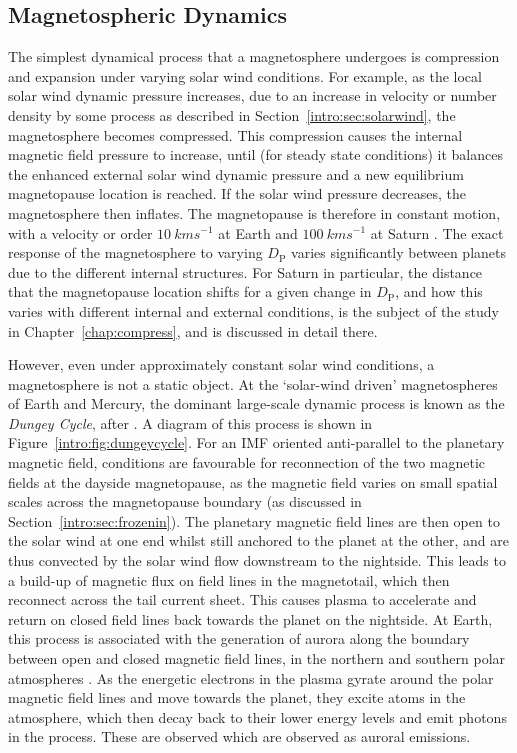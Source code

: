 \subsection{Magnetospheric Dynamics}\label{intro:sec:dynamics}
The simplest dynamical process that a magnetosphere undergoes is compression and expansion under varying solar wind conditions. For example, as the local solar wind dynamic pressure increases, due to an increase in velocity or number density by some process as described in Section~\ref{intro:sec:solarwind}, the magnetosphere becomes compressed. This compression causes the internal magnetic field pressure to increase, until (for steady state conditions) it balances the enhanced external solar wind dynamic pressure and a new equilibrium magnetopause location is reached. If the solar wind pressure decreases, the magnetosphere then inflates. The magnetopause is therefore in constant motion, with a velocity or order $\SI{10}{kms^{-1}}$ at Earth \citep{berchem1982} and $\SI{100}{kms^{-1}}$ at Saturn \citep{masters2011}. The exact response of the magnetosphere to varying $D_\mathrm{P}$ varies significantly between planets due to the different internal structures. For Saturn in particular, the distance that the magnetopause location shifts for a given change in $D_\mathrm{P}$, and how this varies with different internal and external conditions, is the subject of the study in Chapter~\ref{chap:compress}, and is discussed in detail there.

However, even under approximately constant solar wind conditions, a magnetosphere is not a static object. At the `solar-wind driven' magnetospheres of Earth and Mercury, the dominant large-scale dynamic process is known as the \textit{Dungey Cycle}, after \citet{dungey1961}. A diagram of this process is shown in Figure~\ref{intro:fig:dungeycycle}. For an IMF oriented anti-parallel to the planetary magnetic field, conditions are favourable for reconnection of the two magnetic fields at the dayside magnetopause, as the magnetic field varies on small spatial scales across the magnetopause boundary (as discussed in Section~\ref{intro:sec:frozenin}). The planetary magnetic field lines are then open to the solar wind at one end whilst still anchored to the planet at the other, and are thus convected by the solar wind flow downstream to the nightside. This leads to a build-up of magnetic flux on field lines in the magnetotail, which then reconnect across the tail current sheet. This causes plasma to accelerate and return on closed field lines back towards the planet on the nightside. At Earth, this process is associated with the generation of aurora along the boundary between open and closed magnetic field lines, in the northern and southern polar atmospheres \citep[e.g.][]{milan2007}. As the energetic electrons in the plasma gyrate around the polar magnetic field lines and move towards the planet, they excite atoms in the atmosphere, which then decay back to their lower energy levels and emit photons in the process. These are observed which are observed as auroral emissions.

